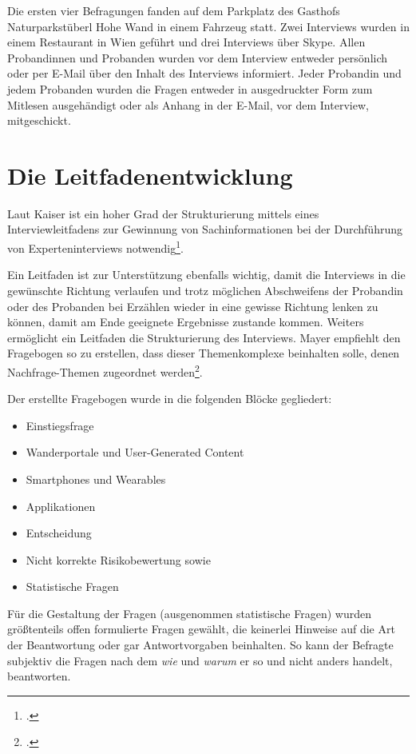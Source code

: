 Die ersten vier Befragungen fanden auf dem Parkplatz des Gasthofs Naturparkstüberl Hohe Wand in einem Fahrzeug statt. 
Zwei Interviews wurden in einem Restaurant in Wien geführt und drei Interviews über Skype. Allen Probandinnen und Probanden wurden vor dem Interview entweder persönlich oder per E-Mail über den Inhalt des Interviews informiert. Jeder Probandin und jedem Probanden wurden die Fragen entweder in ausgedruckter Form zum Mitlesen ausgehändigt oder als Anhang in der E-Mail, vor dem Interview, mitgeschickt.

\section{Die Leitfadenentwicklung}

Laut Kaiser ist ein hoher Grad der Strukturierung mittels eines Interviewleitfadens zur Gewinnung von Sachinformationen bei der Durchführung von Experteninterviews notwendig\footcite[S. 3]{kaiser}.

Ein Leitfaden ist zur Unterstützung ebenfalls wichtig, damit die Interviews in die gewünschte Richtung verlaufen und trotz möglichen Abschweifens der Probandin oder des Probanden bei Erzählen wieder in eine gewisse Richtung lenken zu können, damit am Ende geeignete Ergebnisse zustande kommen. Weiters ermöglicht ein Leitfaden die Strukturierung des Interviews. Mayer empfiehlt den Fragebogen so zu erstellen, dass dieser Themenkomplexe beinhalten solle, denen Nachfrage-Themen zugeordnet werden\footcite[S. 45]{mayer}. 

Der erstellte Fragebogen wurde in die folgenden Blöcke gegliedert:
\begin{itemize}
	\item Einstiegsfrage
	\item Wanderportale und User-Generated Content
	\item Smartphones und Wearables
	\item Applikationen
	\item Entscheidung
	\item Nicht korrekte Risikobewertung sowie
	\item Statistische Fragen
\end{itemize}

Für die Gestaltung der Fragen (ausgenommen statistische Fragen) wurden größtenteils offen formulierte Fragen gewählt, die keinerlei Hinweise auf die Art der Beantwortung oder gar Antwortvorgaben beinhalten. So kann der Befragte subjektiv die Fragen nach dem \textit{wie} und \textit{warum} er so und nicht anders handelt, beantworten. 



